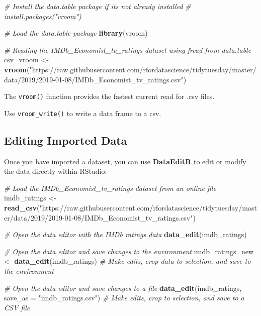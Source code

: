 \documentclass[
]{book}
\newenvironment{Shaded}{\begin{snugshade}}{\end{snugshade}}
\newcommand{\AttributeTok}[1]{\textcolor[rgb]{0.13,0.29,0.53}{#1}}
\newcommand{\CommentTok}[1]{\textcolor[rgb]{0.56,0.35,0.01}{\textit{#1}}}
\newcommand{\FunctionTok}[1]{\textcolor[rgb]{0.13,0.29,0.53}{\textbf{#1}}}
\newcommand{\NormalTok}[1]{#1}
\newcommand{\OtherTok}[1]{\textcolor[rgb]{0.56,0.35,0.01}{#1}}
\newcommand{\StringTok}[1]{\textcolor[rgb]{0.31,0.60,0.02}{#1}}
\begin{document}
\begin{Shaded}
\begin{Highlighting}[]
\CommentTok{\# Install the data.table package if it\textquotesingle{}s not already installed}
\CommentTok{\# install.packages("vroom")}

\CommentTok{\# Load the data.table package}
\FunctionTok{library}\NormalTok{(vroom)}

\CommentTok{\# Reading the IMDb\_Economist\_tv\_ratings dataset using fread from data.table}
\NormalTok{csv\_vroom }\OtherTok{\textless{}{-}} \FunctionTok{vroom}\NormalTok{(}\StringTok{"https://raw.githubusercontent.com/rfordatascience/tidytuesday/master/data/2019/2019{-}01{-}08/IMDb\_Economist\_tv\_ratings.csv"}\NormalTok{)}
\end{Highlighting}
\end{Shaded}

The \texttt{vroom()} function provides the fastest current read for .csv files.

Use \texttt{vroom\_write()} to write a data frame to a csv.

\subsection*{Editing Imported Data}\label{editing-imported-data}

Once you have imported a dataset, you can use \textbf{DataEditR} to edit or modify the data directly within RStudio:

\begin{Shaded}
\begin{Highlighting}[]
\CommentTok{\# Load the IMDb\_Economist\_tv\_ratings dataset from an online file}
\NormalTok{imdb\_ratings }\OtherTok{\textless{}{-}} \FunctionTok{read\_csv}\NormalTok{(}\StringTok{"https://raw.githubusercontent.com/rfordatascience/tidytuesday/master/data/2019/2019{-}01{-}08/IMDb\_Economist\_tv\_ratings.csv"}\NormalTok{)}
\end{Highlighting}
\end{Shaded}

\begin{Shaded}
\begin{Highlighting}[]
\CommentTok{\# Open the data editor with the IMDb ratings data}
\FunctionTok{data\_edit}\NormalTok{(imdb\_ratings)}

\CommentTok{\# Open the data editor and save changes to the environment}
\NormalTok{imdb\_ratings\_new }\OtherTok{\textless{}{-}} \FunctionTok{data\_edit}\NormalTok{(imdb\_ratings)  }\CommentTok{\# Make edits, crop data to selection, and save to the environment}

\CommentTok{\# Open the data editor and save changes to a file}
\FunctionTok{data\_edit}\NormalTok{(imdb\_ratings, }\AttributeTok{save\_as =} \StringTok{"imdb\_ratings.csv"}\NormalTok{)  }\CommentTok{\# Make edits, crop to selection, and save to a CSV file}
\end{Highlighting}
\end{Shaded}
\end{document}
